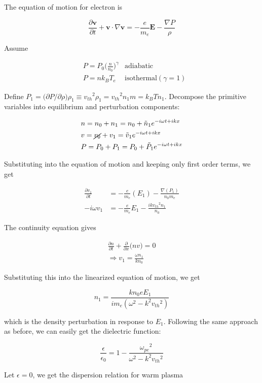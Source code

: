 \documentclass[
  notoc %
]{tufte-book}
\begin{document}
The equation of motion for electron is

\[
\frac{\partial \mathbf{v}}{\partial t}+\mathbf{v}\cdot\nabla\mathbf{v}=-\frac{e}{m_e}\mathbf{E}-\frac{\nabla P}{\rho}
\]

Assume

\[
\begin{aligned}
&P=P_0 \Big( \frac{n}{n_0}\Big)^\gamma  &\text{adiabatic}\\
&P=nk_B T_e  &\text{isothermal}(\gamma=1)
\end{aligned}
\]

Define
\(P_1=\Big( \partial P/\partial \rho\Big)\rho_1\equiv {v_{th}}^2\rho_1={v_{th}}^2 n_1 m=k_BTn_1\).
Decompose the primitive variables into equilibrium and perturbation
components:

\[
\begin{aligned}
&n= n_0+n_1=n_0+\tilde{n}_1e^{-i\omega t+ikx} \\
&v=\cancel{v_0}+v_1=\tilde{v}_1 e^{-i\omega t+ikx} \\
&P=P_0+P_1=P_0+\tilde{P}_1e^{-i\omega t+ikx}
\end{aligned}
\]

Substituting into the equation of motion and keeping only first order
terms, we get

\[
\begin{aligned}
\frac{\partial v_1}{\partial t}&=-\frac{e}{m_e}(E_1)-\frac{\nabla (P_1)}{n_0m_e} \\
-i\omega v_1&=-\frac{e}{m_e}E_1-\frac{ik{v_{th}}^2 n_1}{n_0}
\end{aligned}
\]

The continuity equation gives

\[
\begin{aligned}
\frac{\partial n}{\partial t}+\frac{\partial}{\partial x}\Big( nv\Big)=0 \\
\Rightarrow v_1=\frac{\omega n_1}{kn_0}
\end{aligned}
\]

Substituting this into the linearized equation of motion, we get

\[
n_1=\frac{kn_0eE_1}{im_e(\omega^2-k^2{v_{th}}^2)}
\]

which is the density perturbation in response to \(E_1\). Following the
same approach as before, we can easily get the dielectric function:

\[
\frac{\epsilon}{\epsilon_0}=1-\frac{{\omega_{pe}}^2}{\omega^2-k^2{v_{th}}^2}
\]

Let \(\epsilon=0\), we get the dispersion relation for warm plasma
\end{document}
